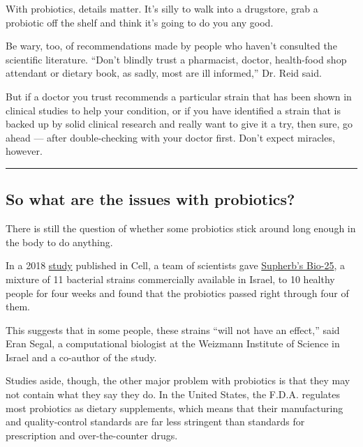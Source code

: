 With probiotics, details matter. It's silly to walk into a drugstore,
grab a probiotic off the shelf and think it's going to do you any good.

Be wary, too, of recommendations made by people who haven't consulted
the scientific literature. ``Don't blindly trust a pharmacist, doctor,
health-food shop attendant or dietary book, as sadly, most are ill
informed,'' Dr. Reid said.

But if a doctor you trust recommends a particular strain that has been
shown in clinical studies to help your condition, or if you have
identified a strain that is backed up by solid clinical research and
really want to give it a try, then sure, go ahead --- after
double-checking with your doctor first. Don't expect miracles, however.

\begin{center}\rule{0.5\linewidth}{\linethickness}\end{center}

\hypertarget{so-what-are-the-issues-with-probiotics}{%
\subsection{So what are the issues with
probiotics?}\label{so-what-are-the-issues-with-probiotics}}

There is still the question of whether some probiotics stick around long
enough in the body to do anything.

In a 2018
\href{https://linkinghub.elsevier.com/retrieve/pii/S0092-8674(18)31102-4}{study}
published in Cell, a team of scientists gave
\href{https://www.supherb.co.il/en/it-works-naturally/probiotics-series/bio-25/}{Supherb's
Bio-25}, a mixture of 11 bacterial strains commercially available in
Israel, to 10 healthy people for four weeks and found that the
probiotics passed right through four of them.

This suggests that in some people, these strains ``will not have an
effect,'' said Eran Segal, a computational biologist at the Weizmann
Institute of Science in Israel and a co-author of the study.

Studies aside, though, the other major problem with probiotics is that
they may not contain what they say they do. In the United States, the
F.D.A. regulates most probiotics as dietary supplements, which means
that their manufacturing and quality-control standards are far less
stringent than standards for prescription and over-the-counter drugs.

